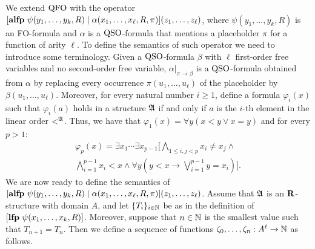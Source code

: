 We extend ${\rm QFO}$ with the operator $[{\bf alfp} \,\,\psi(y_1,\ldots,y_k,R)\mid\alpha(x_1,\ldots,x_{\ell},R,\pi)](z_1,\ldots,z_{\ell})$, where $\psi(y_1,\ldots,y_k,R)$ 
is an FO-formula 
and $\alpha$  is a ${\rm QSO}$-formula 
that mentions a placeholder $\pi$ for a function of arity $\ell$.
To define the semantics of such operator 
we need to introduce some terminology. Given a ${\rm QSO}$-formula $\beta$ with $\ell$ first-order free variables and no second-order free variable, $\alpha|_{\pi\to\beta}$ is a ${\rm QSO}$-formula obtained from $\alpha$ by replacing every occurrence $\pi(u_1, \ldots, u_\ell)$ of the placeholder by $\beta(u_1, \ldots, u_\ell)$.
Moreover, for every natural number $i \geq 1$, define a formula $\varphi_i(x)$ such that $\varphi_i(a)$ holds in a structure $\mathfrak{A}$ if and only if $a$ is the $i$-th element in the linear order  $<^{\mathfrak{A}}$.
Thus, we have that $\varphi_1(x) = \forall y(x < y \vee x = y)$ and for every $p > 1$:
\begin{multline*}
\varphi_p(x) = \exists x_1 \cdots \exists x_{p-1}[\bigwedge_{1\leq i,j < p}x_i\neq x_j \wedge\,\\ \bigwedge_{i = 1}^{p-1} x_i < x  \wedge \forall y(y < x \to \bigvee_{i = 1}^{p-1} y = x_i)].
\end{multline*}
We are now ready to define the semantics of $[{\bf alfp} \,\,\psi(y_1,\ldots,y_k,R)\mid\alpha(x_1,\ldots,x_{\ell},R,\pi)](z_1,\ldots,z_{\ell})$. 
Assume that $\mathfrak{A}$ is an $\mathbf{R}$-structure with domain $A$, and let $\{T_i\}_{i\in\mathbb{N}}$ be as in the definition of $[{\bf lfp} \,\,\psi(x_1,\ldots,x_k,R)]$.
Moreover, suppose that $n\in\mathbb{N}$ is the smallest value such that $T_{n+1} = T_n$. 
Then we define a sequence of functions $\zeta_0,\ldots,\zeta_n:A^{\ell}\to\mathbb{N}$ as follows. 
